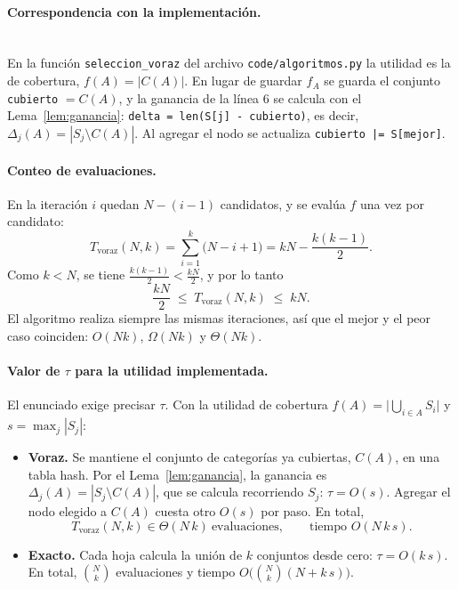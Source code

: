 \paragraph{Correspondencia con la implementación.}\mbox{}\\
En la función \texttt{seleccion\_voraz} del archivo \texttt{code/algoritmos.py} la utilidad es la de cobertura, $f(A)=|C(A)|$. En lugar de guardar $f_A$ se guarda el conjunto \texttt{cubierto} $=C(A)$, y la ganancia de la línea 6 se calcula con el Lema~\ref{lem:ganancia}: \texttt{delta = len(S[j] - cubierto)}, es decir, $\Delta_j(A)=|S_j\setminus C(A)|$. Al agregar el nodo se actualiza \texttt{cubierto |= S[mejor]}.

\paragraph{Conteo de evaluaciones.} En la iteración $i$ quedan $N-(i-1)$ candidatos, y se evalúa $f$ una vez por candidato:
\[
T_{\text{voraz}}(N,k) = \sum_{i=1}^{k}\big(N-i+1\big) = kN - \frac{k(k-1)}{2}.
\]
Como $k<N$, se tiene $\frac{k(k-1)}{2} < \frac{kN}{2}$, y por lo tanto
\[
\frac{kN}{2} \;\le\; T_{\text{voraz}}(N,k) \;\le\; kN .
\]
El algoritmo realiza siempre las mismas iteraciones, así que el mejor y el peor caso coinciden: $O(Nk)$, $\Omega(Nk)$ y $\Theta(Nk)$.

\paragraph{Valor de $\tau$ para la utilidad implementada.} El enunciado exige precisar $\tau$. Con la utilidad de cobertura $f(A)=\big|\bigcup_{i\in A}S_i\big|$ y $s=\max_j|S_j|$:
\begin{itemize}
  \item \textbf{Voraz.} Se mantiene el conjunto de categorías ya cubiertas, $C(A)$, en una tabla hash. Por el Lema~\ref{lem:ganancia}, la ganancia es $\Delta_j(A)=|S_j\setminus C(A)|$, que se calcula recorriendo $S_j$: $\tau=O(s)$. Agregar el nodo elegido a $C(A)$ cuesta otro $O(s)$ por paso. En total,
  \[
  T_{\text{voraz}}(N,k)\in\Theta(N\,k)\ \text{evaluaciones}, \qquad \text{tiempo } O(N\,k\,s).
  \]
  \item \textbf{Exacto.} Cada hoja calcula la unión de $k$ conjuntos desde cero: $\tau=O(k\,s)$. En total, $\binom{N}{k}$ evaluaciones y tiempo $O\big(\binom{N}{k}(N + k\,s)\big)$.
\end{itemize}

